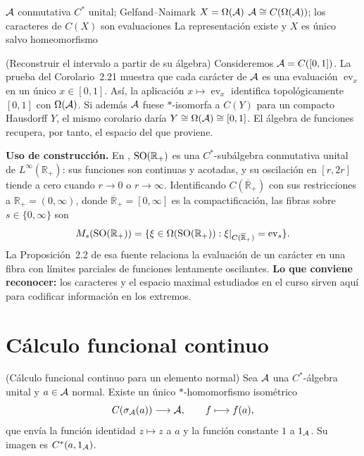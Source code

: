 \proofdiagram
{$\mathcal A$ conmutativa $C^*$ unital; Gelfand--Naimark}
{$X=\Omega(\mathcal A)$}
{$\mathcal A\cong C(\Omega(\mathcal A))$; los caracteres de $C(X)$ son evaluaciones}
{La representación existe y $X$ es único salvo homeomorfismo}

\begin{cthejemplo}{(Reconstruir el intervalo a partir de su álgebra)}
Consideremos $\mathcal A=C([0,1])$. La prueba del Corolario~2.21 muestra que cada
carácter de $\mathcal A$ es una evaluación $\operatorname{ev}_x$ en un único
$x\in[0,1]$. Así, la aplicación
$x\mapsto\operatorname{ev}_x$ identifica topológicamente
$[0,1]$ con $\Omega(\mathcal A)$.
Si además $\mathcal A$ fuese $*$-isomorfa a $C(Y)$ para un compacto Hausdorff $Y$,
el mismo corolario daría $Y\cong\Omega(\mathcal A)\cong[0,1]$.
El álgebra de funciones recupera, por tanto, el espacio del que proviene.
\end{cthejemplo}

\begin{investigacion}[unbreakable]
\textbf{Uso de construcción.} En \cite[Sec.~2, pp.~465--466]{Karlovich2017},
$\operatorname{SO}(\mathbb R_+)$ es una $C^*$-subálgebra conmutativa unital de
$L^\infty(\mathbb R_+)$: sus funciones son continuas y acotadas, y su oscilación
en $[r,2r]$ tiende a cero cuando $r\to0$ o $r\to\infty$.
Identificando $C(\overline{\mathbb R}_+)$ con sus
restricciones a $\mathbb R_+=(0,\infty)$, donde
$\overline{\mathbb R}_+=[0,\infty]$ es la compactificación, las fibras sobre
$s\in\{0,\infty\}$ son
\[
 M_s(\operatorname{SO}(\mathbb R_+))=
 \{\xi\in\Omega(\operatorname{SO}(\mathbb R_+)):
 \xi|_{C(\overline{\mathbb R}_+)}=\operatorname{ev}_s\}.
\]
La Proposición~2.2 de esa fuente relaciona la evaluación de un carácter en una fibra
con límites parciales de funciones lentamente oscilantes.
\textbf{Lo que conviene reconocer:} los caracteres y el espacio maximal estudiados
en el curso sirven aquí para codificar información en los extremos.
\end{investigacion}

\section{Cálculo funcional continuo}

\begin{cthteorema}{(Cálculo funcional continuo para un elemento normal)}
Sea $\mathcal A$ una $C^*$-álgebra unital y $a\in\mathcal A$ normal. Existe un único
$*$-homomorfismo isométrico
\[
 C(\sigma_\mathcal A(a))\longrightarrow\mathcal A,
 \qquad f\longmapsto f(a),
\]
que envía la función identidad $z\mapsto z$ a $a$ y la función constante $1$ a $1_\mathcal A$.
Su imagen es $C^*(a,1_\mathcal A)$.
\end{cthteorema}

